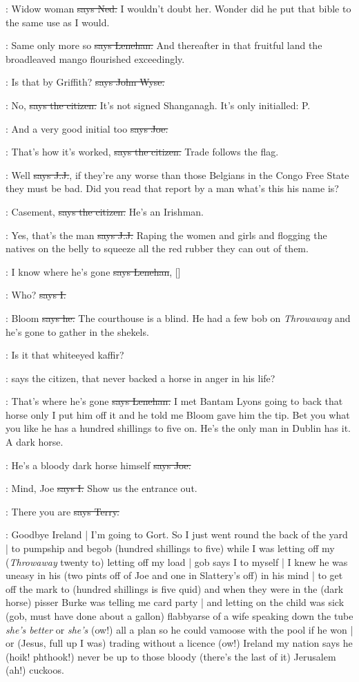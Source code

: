 \lambert:
Widow woman
\sout{says Ned.}
I wouldn't doubt her.
Wonder did he put that bible to the same use as I would.

\lenehan:
Same only more so
\sout{says Lenehan.}
And thereafter in that fruitful land
the broadleaved mango flourished exceedingly.

\johnwyse:
Is that by Griffith?
\sout{says John Wyse.}

\citizen:
No,
\sout{says the citizen.}
It's not signed Shanganagh.
It's only initialled:
P.

\joe:
And a very good initial too
\sout{says Joe.}

\citizen:
That's how it's worked,
\sout{says the citizen.}
Trade follows the flag.

\jjom:
Well
\sout{says J.J.},
if they're any worse than those Belgians in the Congo Free State
they must be bad.
Did you read that report by a man what's this his name is?

\citizen:
Casement,
\sout{says the citizen.}
He's an Irishman.

\jjom:
Yes,
that's the man
\sout{says J.J.}
Raping the women and girls and flogging
the natives on the belly to squeeze all the red rubber they can out of them.

\lenehan:
I know where he's gone
\sout{says Lenehan},
[]

:
Who?
\sout{says I.}

\lenehan:
Bloom
\sout{says he.}
The courthouse is a blind.
He had a few bob on \emph{Throwaway} and he's gone to gather in the shekels.

\citizen:
Is it that whiteeyed kaffir?

\Nq:
says the citizen,
that never backed a horse
in anger in his life?

\lenehan:
That's where he's gone
\sout{says Lenehan.}
I met Bantam Lyons going to back
that horse only I put him off it and he told me Bloom gave him the tip.
Bet you what you like he has a hundred shillings to five on.
He's the only man in Dublin has it.
A dark horse.

\joe:
He's a bloody dark horse himself
\sout{says Joe.}

:
Mind,
Joe
\sout{says I.}
Show us the entrance out.

\terry:
There you are
\sout{says Terry.}

\Nq:
Goodbye Ireland |
I'm going to Gort.
So I just went round the back of the yard |
to pumpship and begob
(hundred shillings to five)
while I was letting off my
(\emph{Throwaway} twenty to)
letting off my load |
gob says I to myself |
I knew he was uneasy in his
(two pints off of Joe and one in Slattery's off)
in his mind |
to get off the mark to
(hundred shillings is five quid)
and when they were in the
(dark horse)
pisser Burke
was telling me card party |
and letting on the child was sick
(gob,
must have done about a gallon)
flabbyarse of a wife speaking down the tube
\emph{she's better} or \emph{she's}
(ow!)
all a plan so he could vamoose with the pool if he won |
or
(Jesus,
full up I was)
trading without a licence
(ow!)
Ireland my nation says he
(hoik!
phthook!)
never be up to those bloody
(there's the last of it)
Jerusalem
(ah!)
cuckoos.

